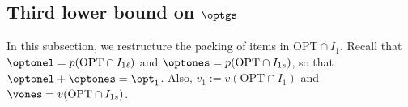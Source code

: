 \subsection{Third lower bound on \texorpdfstring{$\optgs$}{optgs}}
\label{sec:thirdlb}



In this subsection, we restructure the packing of items in $\text{OPT}\cap I_1$. Recall that $\optonel = p(\text{OPT}\cap I_{1\ell})$ and $\optones = p(\text{OPT}\cap I_{1s})$, so that $\optonel+\optones = \opt_1$. Also, $v_1 := v(\text{OPT}\cap I_1)$ and $\vones = v(\text{OPT}\cap I_{1s})$. 









